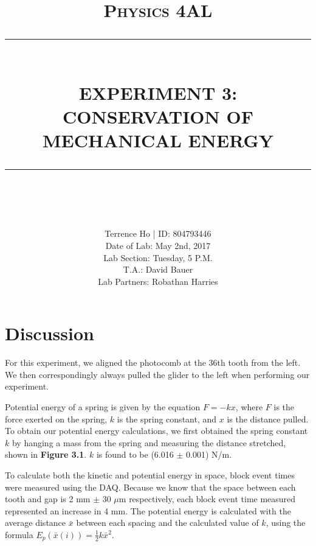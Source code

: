 \documentclass[11pt]{report}
\newcommand{\HRule}[1]{\rule{\linewidth}{#1}}
\begin{document}
\title{ \normalsize \textsc{Physics 4AL}
        \\ [2.0cm]
        \HRule{0.5pt} \\
        \LARGE \textbf{\uppercase{Experiment 3: Conservation of Mechanical Energy}}
        \HRule{2pt} \\ [0.5cm]
        \vspace*{2\baselineskip}}

\date{}

\author{
        Terrence Ho | ID: 804793446 \\ 
        Date of Lab: May 2nd, 2017 \\
        Lab Section: Tuesday, 5 P.M.\\
        T.A.: David Bauer\\
        Lab Partners: Robathan Harries}

\maketitle
\tableofcontents
\newpage

\sectionfont{\scshape}


\section*{Discussion}

For this experiment, we aligned the photocomb at the 36th tooth from the left.  We then
correspondingly always pulled the glider to the left when performing our
experiment.  

Potential energy of a spring is given by the equation \(F = -kx\), where \(F\) is the force
exerted on the spring, \(k\) is the spring constant, and \(x\) is the distance pulled. 
To obtain our potential energy calculations, we first obtained the spring constant 
\(k\) by hanging a mass from the spring and measuring the distance stretched,
shown in \textbf{Figure 3.1}.  \(k\) is found to be (6.016 $\pm$ 0.001) N/m.

To calculate both the kinetic and potential energy in space, block event times
were measured using the DAQ.  Because we know that the space between each tooth
and gap is 2 mm $\pm$ 30 $\mu$m respectively, each block event time measured represented an
increase in 4 mm.  The potential energy is calculated with the average distance
$\bar{x}$ between each spacing and the calculated value of \(k\), using the formula 
\(E_p(\bar{x}(i)) = \frac{1}{2}k\bar{x}^2\).
\end{document}
